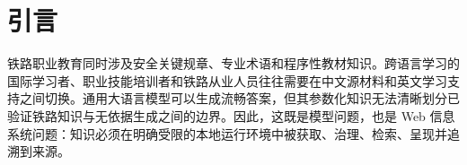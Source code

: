 \begin{abstract}

\textbf{研究背景。} 中国高铁技术的国际化应用不断扩大，使双语知识传递与职业培训需求持续增长。现有铁路大语言模型研究往往分别考察领域适配或检索增强生成，对双语模型适配、治理式检索、证据来源与资源约束部署之间的协同关系缺少联合验证。因此，本研究以知识增强型大语言模型为核心，并构建受约束人工智能智能体系统作为可控的实验与应用环境，面向国际学习者和职业培训学员、铁路技术与服务从业者，以及培训、咨询和管理人员。

\textbf{研究方法。} 研究构建专家治理的双语铁路语料，并采用按知识对分组的控制策略，隔离训练、验证与留出评估记录。实验比较 Qwen2.5-7B 和 GLM-4-9B 在双语 QLoRA 适配前后的表现，并以 Qwen3-14B 作为参考模型；在 400 个留出知识对上比较 BM25、BGE-M3 密集检索与倒数排名融合混合检索，在 1,526 个留出双语问答样本上比较无检索生成与检索增强生成。评价指标包括证据 Recall@k、平均倒数排名、Answer F1、配对显著性、证据支持度和单机部署资源使用。

\textbf{研究结果。} 混合检索在中文和英文上的证据 Recall@5 分别达到 0.715 和 0.708，均高于对应最优单一检索器的 0.690 和 0.685；双语字段索引取得最高的跨语言均衡均值 0.696。Qwen QLoRA 将中文留出问答 Answer F1 从 0.189 提升至 0.398，将英文从 0.437 提升至 0.648，且两项提升经 Holm 校正后仍具有显著性。在混合检索增强生成条件下，其 Answer F1 达到最高的 0.660 和 0.651，高于 Qwen3-14B 参考模型的 0.442 和 0.454。所有被评估生成器条件均在定义的单机资源边界内完成运行。

\textbf{研究结论。} 将双语参数高效适配与治理式混合检索相结合，可以在资源约束的单机部署条件下提升跨语言证据访问和领域问答表现。该模型研究框架为联合评价模型适配、知识检索与证据治理提供了可迁移的方法，也为双语铁路职业教育和国际从业人员培训提供了可本地控制的技术基础。

\textbf{关键词：} 知识增强型大语言模型；双语领域适配；检索增强生成；证据约束生成；铁路职业教育；资源约束部署；受约束人工智能智能体；Web 信息系统

\end{abstract}

\section{引言}

铁路职业教育同时涉及安全关键规章、专业术语和程序性教材知识。跨语言学习的国际学习者、职业技能培训者和铁路从业人员往往需要在中文源材料和英文学习支持之间切换。通用大语言模型可以生成流畅答案，但其参数化知识无法清晰划分已验证铁路知识与无依据生成之间的边界。因此，这既是模型问题，也是 Web 信息系统问题：知识必须在明确受限的本地运行环境中被获取、治理、检索、呈现并追溯到来源。


